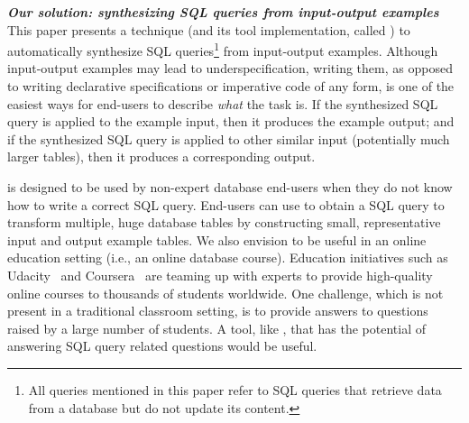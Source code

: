 

\vspace{1mm}
\noindent \textbf{\textit{Our solution: synthesizing SQL queries from input-output examples}}
This paper presents a technique (and its tool
implementation, called \ourtool) to automatically
synthesize SQL queries\footnote{
All queries mentioned in this paper refer to SQL queries
that retrieve data from a database but
do not update its content.}
from input-output examples.
Although input-output examples may lead to
underspecification, writing them, as opposed to writing
declarative specifications or imperative code
of any form, is one of the easiest ways
for end-users to describe \textit{what} the task is.
If the synthesized SQL query is applied
to the example input, then it produces the example output; and if the
synthesized SQL query is applied to other
similar input (potentially much larger tables),
then it produces a corresponding output.




\ourtool is designed to be used by non-expert database
end-users when they do not know how
to write a correct SQL query. 
End-users can use \ourtool to obtain a SQL query to transform
multiple, huge database tables by constructing small, representative
input and output example tables. 
We also envision \ourtool to be useful in an online education
setting (i.e., an online database course). 
Education initiatives such as Udacity~\cite{udacity} and Coursera~\cite{coursera}
 are teaming up with experts to provide
high-quality online courses to thousands of students worldwide.
One challenge, which is not present in a traditional classroom
setting, is to provide answers to questions raised by a large
number of students. A tool, like \ourtool,
that has the potential of answering SQL query related questions
would be useful.



